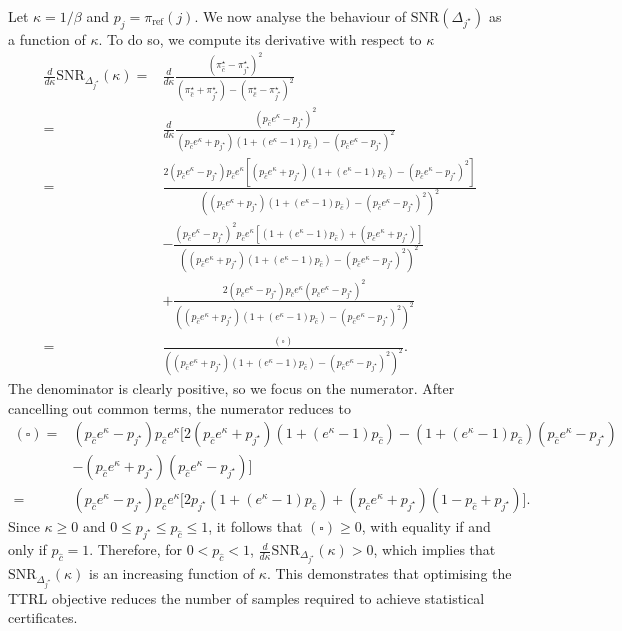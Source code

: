 Let $\kappa = 1/\beta$ and $p_j=\pi_{\text{ref}}(j)$. We now analyse the behaviour of $\text{SNR}({\Delta_{j^\star}})$ as a function of $\kappa$. To do so, we compute its derivative with respect to $\kappa$
\begin{align*}
    \frac{d}{d\kappa}\text{SNR}_{\Delta_{j^\star}}(\kappa) =& \frac{d}{d\kappa}\frac{(\pi_{\hat{c}}^\star- \pi^\star_{j^\star})^2}{(\pi^\star_{\hat{c}}+\pi^\star_{j^\star})-(\pi_{\hat{c}}^\star- \pi^\star_{j^\star})^2}\\
    =& \frac{d}{d\kappa}\frac{(p_{\hat{c}}e^\kappa - p_{j^\star})^2}{(p_{\hat{c}}e^\kappa+p_{j^\star})(1+(e^\kappa-1)p_{\hat{c}})-(p_{\hat{c}}e^\kappa - p_{j^\star})^2}\\
    =& \frac{2(p_{\hat{c}}e^\kappa - p_{j^\star})p_{\hat{c}}e^\kappa\left[(p_{\hat{c}}e^\kappa+p_{j^\star})(1+(e^\kappa-1)p_{\hat{c}})-(p_{\hat{c}}e^\kappa - p_{j^\star})^2\right]}{((p_{\hat{c}}e^\kappa+p_{j^\star})(1+(e^\kappa-1)p_{\hat{c}})-(p_{\hat{c}}e^\kappa - p_{j^\star})^2)^2} \\
    &- \frac{(p_{\hat{c}}e^\kappa - p_{j^\star})^2p_{\hat{c}}e^\kappa\left[(1+(e^\kappa-1)p_{\hat{c}}) + (p_{\hat{c}}e^\kappa+p_{j^\star})\right]}{\left((p_{\hat{c}}e^\kappa+p_{j^\star})(1+(e^\kappa-1)p_{\hat{c}})-(p_{\hat{c}}e^\kappa - p_{j^\star})^2\right)^2}\\
    &+ \frac{2(p_{\hat{c}}e^\kappa-p_{j^\star})p_{\hat{c}}e^\kappa(p_{\hat{c}}e^\kappa - p_{j^\star})^2}{\left((p_{\hat{c}}e^\kappa+p_{j^\star})(1+(e^\kappa-1)p_{\hat{c}})-(p_{\hat{c}}e^\kappa - p_{j^\star})^2\right)^2}\\
    =& \frac{(\square)}{((p_{\hat{c}}e^\kappa+p_{j^\star})(1+(e^\kappa-1)p_{\hat{c}})-(p_{\hat{c}}e^\kappa - p_{j^\star})^2)^2}.
\end{align*}
The denominator is clearly positive, so we focus on the numerator. After cancelling out common terms, the numerator reduces to
\begin{align*}
       (\square) =& (p_{\hat{c}}e^\kappa - p_{j^\star})p_{\hat{c}}e^\kappa\Big[2(p_{\hat{c}}e^\kappa+p_{j^\star})(1+(e^\kappa-1)p_{\hat{c}}) - (1+(e^\kappa-1)p_{\hat{c}})(p_{\hat{c}}e^\kappa-p_{j^\star}) \\
       &- (p_{\hat{c}}e^\kappa+p_{j^\star})(p_{\hat{c}}e^\kappa-p_{j^\star})\Big]\\
       =& (p_{\hat{c}}e^\kappa - p_{j^\star})p_{\hat{c}}e^\kappa\Big[2p_{j^\star}(1+(e^\kappa-1)p_{\hat{c}})+(p_{\hat{c}}e^\kappa+p_{j^\star})(1-p_{\hat{c}}+p_{j^\star})\Big].
\end{align*}
Since $\kappa\geq 0$ and $0\leq p_{j^\star}\leq p_{\hat{c}}\leq 1$, it follows that $(\square)\geq 0$, with equality if and only if $p_{\hat{c}}=1$. Therefore, for $0<p_{\hat{c}}<1$, $ \frac{d}{d\kappa}\text{SNR}_{\Delta_{j^\star}}(\kappa)>0$, which implies that  $\text{SNR}_{\Delta_{j^\star}}(\kappa)$ is an increasing function of $\kappa$. This demonstrates that optimising the TTRL objective reduces the number of samples required to achieve statistical certificates. 
